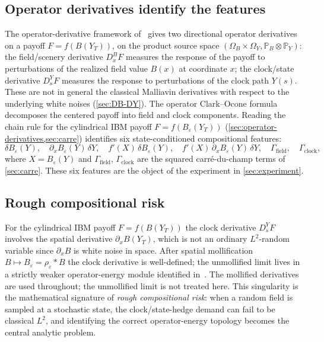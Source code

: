 \documentclass[11pt,reqno]{amsart}
\theoremstyle{plain}
\theoremstyle{definition}
\theoremstyle{remark}
\newcommand{\Prob}{\mathbb P}
\newcommand{\Bvar}{B}
\newcommand{\Yclock}{Y}
\begin{document}
\subsection{Operator derivatives identify the features}\label{sec:intro-operators}

The operator-derivative framework
of~\cite{GammaHierarchyDivergence,OperatorClarkOcone} gives two
directional operator derivatives on a payoff
$F=f(\Bvar(\Yclock_{T}))$, on the product source space
$(\Omega_{\Bvar}\times\Omega_{\Yclock},\Prob_{\Bvar}\otimes\Prob_{\Yclock})$:
the field/scenery derivative $D^{\Bvar}_{x}F$ measures the
response of the payoff to perturbations of the realized field
value $\Bvar(x)$ at coordinate $x$; the clock/state derivative
$D^{\Yclock}_{s}F$ measures the response to perturbations of the
clock path $\Yclock(s)$. These are not in general the classical
Malliavin derivatives with respect to the underlying white
noises (\cref{sec:DB-DY}). The operator Clark--Ocone
formula~\cite[\S 7]{OperatorClarkOcone} decomposes the centered
payoff into field and clock components. Reading the chain rule for the
cylindrical IBM payoff $F=f(\Bvar_{\varepsilon}(\Yclock_{T}))$
(\cref{sec:operator-derivatives,sec:carre}) identifies six
state-conditioned compositional features:
\[
  \delta\Bvar_{\varepsilon}(\Yclock),\quad
  \partial_{x}\Bvar_{\varepsilon}(\Yclock)\,\delta\Yclock,\quad
  f'(X)\,\delta\Bvar_{\varepsilon}(\Yclock),\quad
  f'(X)\,\partial_{x}\Bvar_{\varepsilon}(\Yclock)\,\delta\Yclock,\quad
  \Gamma_{\mathrm{field}},\quad\Gamma_{\mathrm{clock}},
\]
where $X=\Bvar_{\varepsilon}(\Yclock)$ and
$\Gamma_{\mathrm{field}}$, $\Gamma_{\mathrm{clock}}$ are the
squared carr\'e-du-champ terms of \cref{sec:carre}. These six
features are the object of the experiment in
\cref{sec:experiment}.

\subsection{Rough compositional risk}\label{sec:intro-rough}

For the cylindrical IBM payoff $F=f(\Bvar(\Yclock_{T}))$ the
clock derivative $D^{\Yclock}_{s}F$ involves the spatial
derivative $\partial_{x}\Bvar(\Yclock_{T})$, which is not an
ordinary $L^{2}$-random variable since $\partial_{x}\Bvar$ is
white noise in space. After spatial mollification
$\Bvar\mapsto\Bvar_{\varepsilon}=\rho_{\varepsilon}*\Bvar$ the
clock derivative is well-defined; the unmollified limit lives
in a strictly weaker operator-energy module identified
in~\cite{EnergyFirst,FCDC,BidegreeAtlas}. The mollified
derivatives are used throughout; the unmollified limit is not
treated here. This singularity is the mathematical signature of
\emph{rough compositional risk}: when a random field is sampled
at a stochastic state, the clock/state-hedge demand can fail to
be classical $L^{2}$, and identifying the correct
operator-energy topology becomes the central analytic problem.
\end{document}

